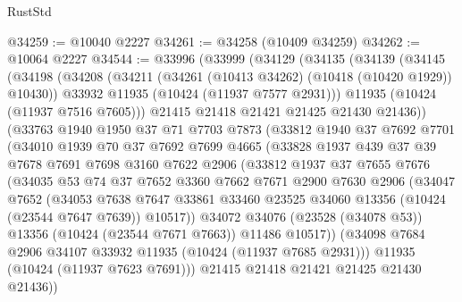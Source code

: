 \begin{lexlean}{RustStd}
\begin{coremodule}
@34259 := @10040 @2227
@34261 := @34258 (@10409 @34259)
@34262 := @10064 @2227
@34544 := @33996
    (@33999
      (@34129
        (@34135
          (@34139
            (@34145
              (@34198
                (@34208
                  (@34211 (@34261 (@10413 @34262) (@10418 (@10420 @1929)) @10430))
                  @33932
                  @11935
                  (@10424 (@11937 @7577 @2931)))
                @11935
                (@10424 (@11937 @7516 @7605)))
              @21415
              @21418
              @21421
              @21425
              @21430
              @21436))
          (@33763
            @1940
            @1950
            @37
            @71
            @7703
            @7873
            (@33812
              @1940
              @37
              @7692
              @7701
              (@34010
                @1939
                @70
                @37
                @7692
                @7699
                @4665
                (@33828
                  @1937
                  @439
                  @37
                  @39
                  @7678
                  @7691
                  @7698
                  @3160
                  @7622
                  @2906
                  (@33812
                    @1937
                    @37
                    @7655
                    @7676
                    (@34035
                      @53
                      @74
                      @37
                      @7652
                      @3360
                      @7662
                      @7671
                      @2900
                      @7630
                      @2906
                      (@34047
                        @7652
                        (@34053
                          @7638
                          @7647
                          @33861
                          @33460
                          @23525
                          @34060
                          @13356
                          (@10424 (@23544 @7647 @7639))
                          @10517))
                      @34072
                      @34076
                      (@23528 (@34078 @53))
                      @13356
                      (@10424 (@23544 @7671 @7663))
                      @11486
                      @10517))
                  (@34098 @7684 @2906 @34107 @33932 @11935 (@10424 (@11937 @7685 @2931)))
                  @11935
                  (@10424 (@11937 @7623 @7691)))
                @21415
                @21418
                @21421
                @21425
                @21430
                @21436))

\end{coremodule}
\end{lexlean}
